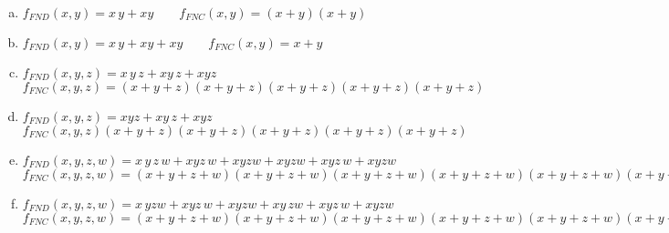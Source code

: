 \begin{enumerate}[a)]
\item $f_{FND}(x,y) = \!x\,\!y + x\!y \qquad f_{FNC}(x,y)=(x+\!y)(\!x+\!y)$
\item $f_{FND}(x,y) = \!x\,\!y + \!xy + xy \qquad f_{FNC}(x,y)=\!x+y$

\item $f_{FND}(x,y,z)= \!x\,\!y\,\!z + x\!y\,\!z + xyz$\\
  $f_{FNC}(x,y,z)=(x+y+\!z)(x+\!y+z)(x+\!y+\!z)(\!x+y+\!z)(\!x+\!y+z)$

\item $f_{FND}(x,y,z)=\!xyz + x\!y\,\!z + xyz$\\
  $f_{FNC}(x,y,z)(x+y+z)(x+y+\!z)(x+\!y+\!z)(\!x+y+\!z)(\!x+\!y+z)$

\item $f_{FND}(x,y,z,w) = \!x\,\!y\,\!z\,\!w + \!xy\!z\,\!w + \!xyzw 
  + x\!yz\!w + xy\!z\,\!w + xyzw$\\
  $f_{FNC}(x,y,z,w) = (x+y+z+\!w)(x+y+\!z+w)(x+y+\!z+\!w)(x+\!y+z+\!w)
  (x+\!y+\!z+w)(\!x+y+z+w)(\!x+y+z+\!w)(\!x+y+\!z+\!w)(\!x+\!y+z+\!w)
  (\!x+\!y+\!z+w)$

\item $f_{FND}(x,y,z,w) = \!x\,\!yzw + \!xy\!z\,\!w + \!xy\!zw + x\!y\,\!zw + 
  xy\!z\,\!w + xyz\!w$\\
  $f_{FNC}(x,y,z,w) = (x+y+z+w)(x+y+z+\!w)(x+y+\!z+w)(x+\!y+\!z+w)
  (x+\!y+\!z+\!w)(\!x+y+z+w)(\!x+y+\!z+w)(\!x+y+\!z+\!w)
  (\!x+\!y+z+\!w)(\!x+\!y+\!z+\!w)$
\end{enumerate}

\bigskip\exercise\smallskip

